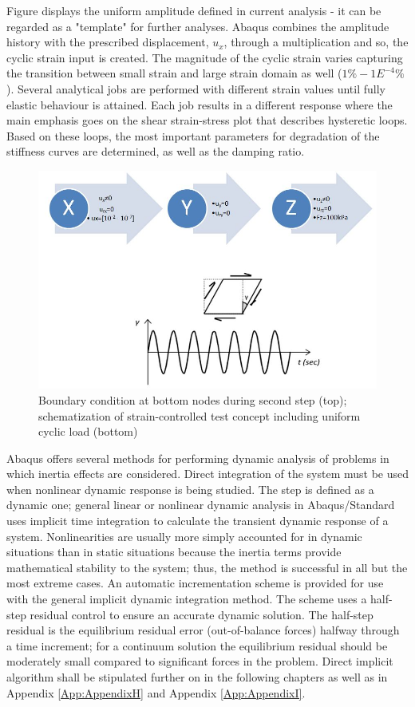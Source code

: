 \documentclass[12pt,a4paper]{report}
\begin{document}
Figure \label{Figure 16} displays the uniform amplitude defined in current analysis - it can be regarded as a "template" for further analyses. Abaqus combines the amplitude history with the prescribed displacement, $u_x$, through a multiplication and so, the cyclic strain input is created. The magnitude of the cyclic strain varies capturing the transition between small strain and large strain domain as well ($1\% -  1E^{-4}\%$). Several analytical jobs are performed with different strain values until fully elastic behaviour is attained. Each job results in a different response where the main emphasis goes on the shear strain-stress plot that describes hysteretic loops. Based on these loops, the most important parameters for degradation of the stiffness curves are determined, as well as the damping ratio.
\begin{figure}[h!]
	\centering
	\includegraphics[width=0.7\linewidth]{"bc1d2"}
	\caption{Boundary condition at bottom nodes during second step (top); schematization of strain-controlled test concept including uniform cyclic load (bottom)}
	\label{strain-test}
\end{figure}

Abaqus offers several methods for performing dynamic analysis of problems in which inertia effects are considered. Direct integration of the system must be used when nonlinear dynamic response is being studied. The step is defined as a dynamic one; general linear or nonlinear dynamic analysis in Abaqus/Standard uses implicit time integration to calculate the transient dynamic response of a system. Nonlinearities are usually more simply accounted for in dynamic situations than in static situations because the inertia terms provide mathematical stability to the system; thus, the method is successful in all but the most extreme cases. An automatic incrementation scheme is provided for use with the general implicit dynamic integration method. The scheme uses a half-step residual control to ensure an accurate dynamic solution. The half-step residual is the equilibrium residual error (out-of-balance forces) halfway through a time increment; for a continuum solution the equilibrium residual should be moderately small compared to significant forces in the problem.
Direct implicit algorithm shall be stipulated further on in the following chapters as well as in Appendix \ref{App:AppendixH} and Appendix \ref{App:AppendixI}.
\newpage
\end{document}
